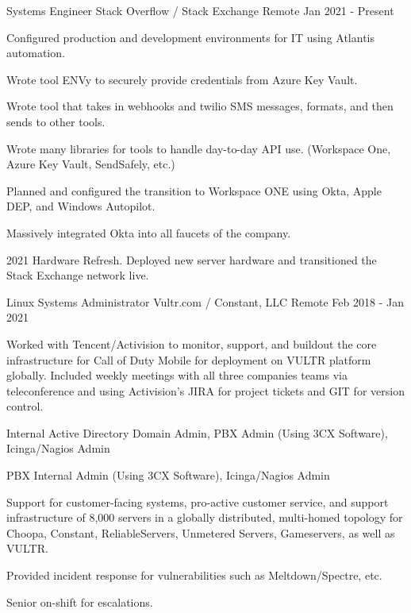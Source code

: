 
\begin{cventries}

	\cventry
	{Systems Engineer}
	{Stack Overflow / Stack Exchange}
	{Remote}
	{Jan 2021 - Present}
	{
		\begin{cvitems}
		\item {Configured production and development environments for IT using Atlantis automation.}
		\item {Wrote tool ENVy to securely provide credentials from Azure Key Vault.}
		\item {Wrote tool that takes in webhooks and twilio SMS messages, formats, and then sends to other tools.}
		\item {Wrote many libraries for tools to handle day-to-day API use. (Workspace One, Azure Key Vault, SendSafely, etc.)}
		\item {Planned and configured the transition to Workspace ONE using Okta, Apple DEP, and Windows Autopilot.}
		\item {Massively integrated Okta into all faucets of the company.}
		\item {2021 Hardware Refresh. Deployed new server hardware and transitioned the Stack Exchange network live.}
		\end{cvitems}
	}


	\cventry
	{Linux Systems Administrator}
	{Vultr.com / Constant, LLC}
	{Remote}
	{Feb 2018 - Jan 2021}
	{
		\begin{cvitems}
		\item {Worked with Tencent/Activision to monitor, support, and buildout the core infrastructure for Call of Duty Mobile for deployment on VULTR platform globally. Included weekly meetings with all three companies teams via teleconference and using Activision's JIRA for project tickets and GIT for version control.}
		\item {Internal Active Directory Domain Admin, PBX Admin (Using 3CX Software), Icinga/Nagios Admin }
		\item {PBX Internal Admin (Using 3CX Software), Icinga/Nagios Admin }
		\item {Support for customer-facing systems, pro-active customer service, and support infrastructure of 8,000 servers in a globally distributed, multi-homed topology for Choopa, Constant, ReliableServers, Unmetered Servers, Gameservers, as well as VULTR.}
		\item {Provided incident response for vulnerabilities such as Meltdown/Spectre, etc.}
		\item {Senior on-shift for escalations.}
		\end{cvitems}
	}


\end{cventries}
